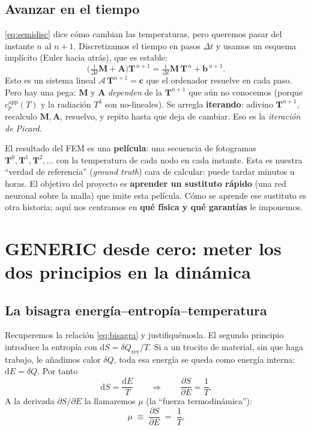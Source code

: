 \documentclass[11pt]{article}
\newcommand{\dd}{\mathrm{d}}
\newcommand{\cpapp}{c_p^{\mathrm{app}}}
\theoremstyle{definition}
\theoremstyle{plain}
\begin{document}
\subsection{Avanzar en el tiempo}

\eqref{eq:semidisc} dice cómo cambian las temperaturas, pero queremos pasar del
instante $n$ al $n+1$. Discretizamos el tiempo en pasos $\Delta t$ y usamos un
esquema implícito (Euler hacia atrás), que es estable:
\begin{equation}
  \Big(\tfrac{1}{\Delta t}\bm M + \bm A\Big)\bm T^{\,n+1}
  = \tfrac{1}{\Delta t}\bm M\,\bm T^{\,n} + \bm b^{\,n+1}.
  \label{eq:beuler}
\end{equation}
Esto es un sistema lineal $\bm{\mathcal A}\,\bm T^{n+1}=\bm c$ que el ordenador
resuelve en cada paso. Pero hay una pega: $\bm M$ y $\bm A$ \emph{dependen} de la
$\bm T^{n+1}$ que aún no conocemos (porque $\cpapp(T)$ y la radiación $T^4$ son
no-lineales). Se arregla \textbf{iterando}: adivino $\bm T^{n+1}$, recalculo
$\bm M,\bm A$, resuelvo, y repito hasta que deja de cambiar. Eso es la
\emph{iteración de Picard}.

El resultado del FEM es una \textbf{película}: una secuencia de fotogramas
$\bm T^0,\bm T^1,\bm T^2,\dots$ con la temperatura de cada nodo en cada instante.
Esta es nuestra ``verdad de referencia'' (\emph{ground truth}) cara de calcular:
puede tardar minutos u horas. El objetivo del proyecto es \textbf{aprender un
sustituto rápido} (una red neuronal sobre la malla) que imite esta película. Cómo
se aprende ese sustituto es otra historia; aquí nos centramos en \textbf{qué física
y qué garantías} le imponemos.

\section{GENERIC desde cero: meter los dos principios en la dinámica}
\label{sec:generic}

\subsection{La bisagra energía--entropía--temperatura}
\label{sec:bisagra}

Recuperemos la relación \eqref{eq:bisagra} y justifiquémosla. El segundo principio
introduce la entropía con $\dd S = \delta Q_{\mathrm{rev}}/T$. Si a un trocito de
material, sin que haga trabajo, le añadimos calor $\delta Q$, toda esa energía se
queda como energía interna: $\dd E = \delta Q$. Por tanto
\begin{equation}
  \dd S = \frac{\dd E}{T}
  \qquad\Longrightarrow\qquad
  \frac{\partial S}{\partial E} = \frac{1}{T}.
  \label{eq:mu}
\end{equation}
A la derivada $\partial S/\partial E$ la llamaremos $\mu$ (la ``fuerza
termodinámica''):
\begin{equation}
  \mu \;\equiv\; \frac{\partial S}{\partial E} \;=\; \frac{1}{T}.
  \label{eq:mudef}
\end{equation}
\end{document}

